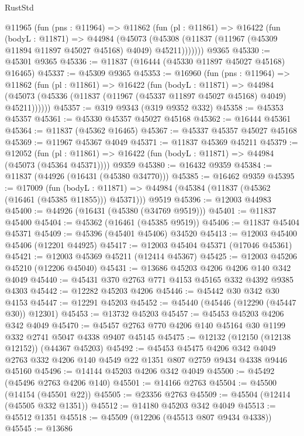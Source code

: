 \begin{lexlean}{RustStd}
\begin{coremodule}
{\begin{coremodule}
{{{{{{{{{{{{{{{{{{{{{{{{{{{{{{{{{{{{{{{{{{{{{{{{{{    @11965
      (fun (pns : @11964) =>
      @11862
        (fun (pl : @11861) =>
        @16422
          (fun (bodyL : @11871) =>
          @44984
            (@45073
              (@45308 (@11837 (@11967 (@45309 @11894 @11897 @45027 @45168) @4049) @45211)))))))
    @9365
@45330 := @45301 @9365
@45336 := @11837 (@16444 (@45330 @11897 @45027 @45168) @16465)
@45337 := @45309 @9365
@45353 := @16960
    (fun (pns : @11964) =>
    @11862
      (fun (pl : @11861) =>
      @16422
        (fun (bodyL : @11871) =>
        @44984 (@45073 (@45336 (@11837 (@11967 (@45337 @11897 @45027 @45168) @4049) @45211))))))
@45357 := @319 @9343 (@319 @9352 @332)
@45358 := @45353 @45357
@45361 := @45330 @45357 @45027 @45168
@45362 := @16444 @45361
@45364 := @11837 (@45362 @16465)
@45367 := @45337 @45357 @45027 @45168
@45369 := @11967 @45367 @4049
@45371 := @11837 @45369 @45211
@45379 := @12052
    (fun (pl : @11861) => @16422 (fun (bodyL : @11871) => @44984 (@45073 (@45364 @45371))))
    @9359
@45380 := @16432 @9359
@45384 := @11837 (@44926 (@16431 (@45380 @34770)))
@45385 := @16462 @9359
@45395 := @17009
    (fun (bodyL : @11871) => @44984 (@45384 (@11837 (@45362 (@16461 (@45385 @11855))) @45371)))
    @9519
@45396 := @12003 @44983
@45400 := @44926 (@16431 (@45380 (@34769 @9519)))
@45401 := @11837 @45400
@45404 := @45362 (@16461 (@45385 @9519))
@45406 := @11837 @45404 @45371
@45409 := @45396 (@45401 @45406) @34520
@45413 := @12003 @45400 @45406 (@12201 @44925)
@45417 := @12003 @45404 @45371 (@17046 @45361)
@45421 := @12003 @45369 @45211 (@12414 @45367)
@45425 := @12003 @45206 @45210 (@12206 @45040)
@45431 := @13686 @45203 @4206 @4206 @140 @342 @4049
@45440 := @45431 @370 @2763 @771 @4153 @45165 @332 @4392 @9385 @4303
@45442 := @12282 @45203 @4206
@45446 := @45442 @30 @342 @30 @4153
@45447 := @12291 @45203
@45452 := @45440 (@45446 (@12290 (@45447 @30)) @12301)
@45453 := @13732 @45203
@45457 := @45453 @45203 @4206 @342 @4049
@45470 := @45457 @2763 @770 @4206 @140 @45164 @30 @1199 @332 @2741 @5047 @4338 @9407 @45145
@45475 := @12132 (@12150 (@12138 @12152)) (@44367 @45203)
@45492 := @45453
    @45475
    @4206
    @342
    @4049
    @2763
    @332
    @4206
    @140
    @4549
    @22
    @1351
    @807
    @2759
    @9434
    @4338
    @9446
    @45160
@45496 := @14144 @45203 @4206 @342 @4049
@45500 := @45492 (@45496 @2763 @4206 @140)
@45501 := @14166 @2763
@45504 := @45500 (@14154 (@45501 @22))
@45505 := @23356 @2763
@45509 := @45504 (@12414 (@45505 @332 @1351))
@45512 := @14180 @45203 @342 @4049
@45513 := @45512 @1351
@45518 := @45509 (@12206 (@45513 @807 @9434 @4338))
@45545 := @13686
}}}}}}}}}}}}}}}}}}}}}}}}}}}}}}}}}}}}}}}}}}}}}}}}}}
\end{coremodule}}
\end{coremodule}
\end{lexlean}
